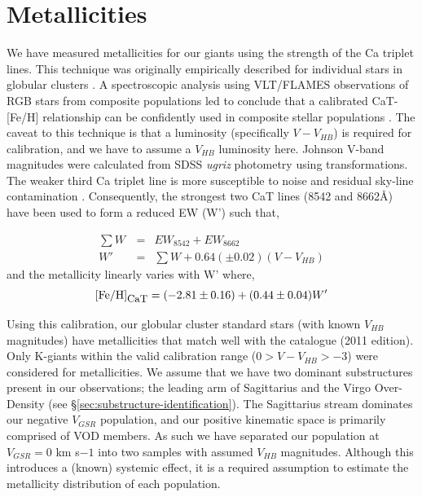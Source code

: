 \documentclass[preprint2]{aastex}
\begin{document}
\section{Metallicities}
\label{sec:metallicities}

We have measured metallicities for our giants using the strength of the Ca triplet lines. This technique was originally empirically described for individual stars in globular  clusters \citep{Armandroff;Da-Costa_1991}. A spectroscopic analysis using VLT/FLAMES observations of RGB stars from composite populations led \citet{Battaglia;et-al_2008} to conclude that a calibrated CaT-[Fe/H] relationship can be confidently used in composite stellar populations \citep[see also][]{Rutledge;Hesser;Stetson_1997, Starkenburg;et-al_2010}. The caveat to this technique is that a luminosity (specifically $V - V_{HB}$) is required for calibration, and we have to assume a $V_{HB}$ luminosity here. Johnson V-band magnitudes were calculated from SDSS \textit{ugriz} photometry using \citet{Jester;et-al_2005} transformations. The weaker third Ca triplet line is more susceptible to noise and residual sky-line contamination \citep{Tolstoy;et-al_2001,Battaglia;et-al_2008}. Consequently, the strongest two CaT lines (8542 and 8662\AA) have been used to form a reduced EW (W') such that,

\begin{eqnarray}
	\textstyle\sum{W}\, &=& EW_{8542} + EW_{8662} \\
	W' &=&\textstyle\sum{W} + 0.64\left(\pm 0.02\right)\left(V-V_{HB}\right)
\end{eqnarray}
\noindent and the metallicity linearly varies with W' where,
\begin{equation}
	\mbox{[Fe/H]}_{\mbox{\small{CaT}}} = (-2.81\pm0.16) + (0.44\pm0.04) W'
	\label{eq:feh-cat}
\end{equation}

Using this calibration, our globular cluster standard stars (with known $V_{HB}$ magnitudes) have metallicities that match well with the \citet{Harris_1996} catalogue (2011 edition). Only K-giants within the valid calibration range ($0 > V-V_{HB} > -3$) were considered for metallicities. We assume that we have two dominant substructures present in our observations; the leading arm of Sagittarius and the Virgo Over-Density (see \S\ref{sec:substructure-identification}). The Sagittarius stream dominates our negative $V_{GSR}$ population, and our positive kinematic space is primarily comprised of VOD members. As such we have separated our population at $V_{GSR} = 0$ km s${-1}$ into two samples with assumed $V_{HB}$ magnitudes. Although this introduces a (known) systemic effect, it is a required assumption to estimate the metallicity distribution of each population.
\end{document}
